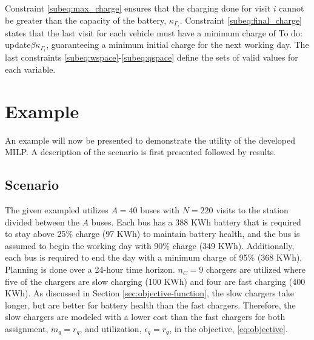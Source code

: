 \documentclass[utf8]{FrontiersinHarvard}
\newcommand{\TODO}[1]{{\color{green} To do: #1}}                                %
\begin{document}
Constraint \eqref{subeq:max_charge} ensures that the charging done for visit $i$ cannot be greater than the capacity of the battery, $\kappa_{\Gamma_i}$. Constraint
\eqref{subeq:final_charge} states that the last visit for each vehicle must have a minimum charge of \TODO{update}$\beta \kappa_{\Gamma_i}$, guaranteeing a minimum initial charge for the next working day.
The last constraints \eqref{subeq:wspace}-\eqref{subeq:qspace} define the sets of valid values for each variable.

\section{Example}
\label{sec:example}

An example will now be presented to demonstrate the utility of the developed MILP. A description of the scenario is
first presented followed by results.

\subsection{Scenario}
The given exampled utilizes $A = 40$ buses with $N = 220$ visits to the station divided between the $A$ buses. Each bus
has a 388 KWh battery that is required to stay above 25\% charge (97 KWh) to maintain battery health, and the bus is
assumed to begin the working day with 90\% charge (349 KWh). Additionally, each bus is required to end the day with a
minimum charge of 95\% (368 KWh). Planning is done over a 24-hour time horizon. $n_C = 9$ chargers are utilized where five
of the chargers are slow charging (100 KWh) and four are fast charging (400 KWh). As discussed in Section
\ref{sec:objective-function}, the slow chargers take longer, but are better for battery health than the fast chargers.
Therefore, the slow chargers are modeled with a lower cost than the fast chargers for both assignment, $m_q = r_q$, and
utilization, $\epsilon_q = r_q$, in the objective, \eqref{eq:objective}.
\end{document}
